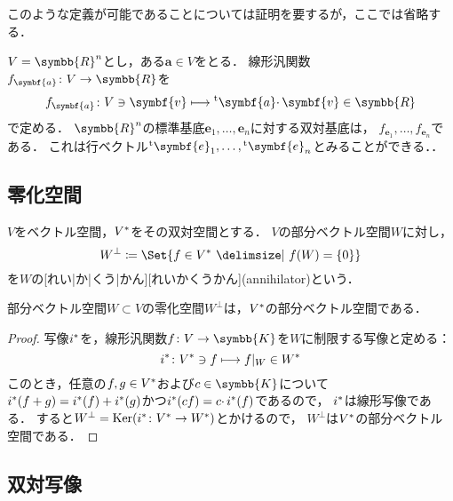 \documentclass[../sotsu.tex]{subfiles}
\begin{document}
このような定義が可能であることについては証明を要するが，ここでは省略する．

\begin{example}
    $V = \symbb{R}^n$とし，ある$\symbf{a} \in V$をとる．
    線形汎関数$f_{\symbf{a}} \colon V \to \symbb{R}$を
    \[  f_{\symbf{a}} \colon V \ni \symbf{v} \longmapsto \tp{\symbf{a}} \cdotp \symbf{v} \in \symbb{R}  \]
    で定める．
    $\symbb{R}^n$の標準基底$\symbf{e}_1, \dots, \symbf{e}_n$に対する双対基底は，
    $f_{\symbf{e}_1}, \dots, f_{\symbf{e}_n}$である．
    これは行ベクトル$\tp{\symbf{e}_1}, \dots, \tp{\symbf{e}_n}$とみることができる．．
\end{example}



\subsection{零化空間}


\begin{definition}[零化空間]
    $V$をベクトル空間，${V}^*$をその双対空間とする．
    $V$の部分ベクトル空間$W$に対し，
    \begin{equation}
        W^\perp  \coloneq  \Set{  f \in \dual{V}  \given  f(W) = \{ 0 \}  }
    \end{equation}
を$W$の[れい|か|くう|かん][れいかくうかん](annihilator)という\cite[\S 4.2]{saito-lin-2007}．
\end{definition}

\begin{proposition}
    部分ベクトル空間$W \subset V$の零化空間$W^\perp$は，${V}^*$の部分ベクトル空間である．
\end{proposition}

\begin{proof}
    写像${i}^*$を，線形汎関数$f \colon V \to \symbb{K}$を$W$に制限する写像と定める：
    \[  {i}^* \colon {V}^* \ni f \longmapsto f \vert_W \in {W}^*  \]
    このとき，任意の$f, g \in {V}^*$および$c \in \symbb{K}$について
    ${i}^*(f + g) = {i}^*(f) + {i}^*(g)$かつ${i}^*(cf) = c \cdotp {i}^*(f)$であるので，
    ${i}^*$は線形写像である．
    すると$W^\perp = \operatorname{Ker}( {i}^* \colon {V}^* \to {W}^* )$とかけるので，
    $W^\perp$は${V}^*$の部分ベクトル空間である．
\end{proof}


\subsection{双対写像}
\end{document}

